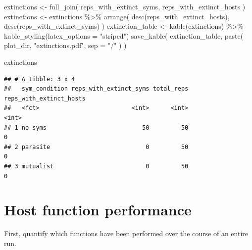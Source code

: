 \documentclass[
]{book}
\newenvironment{Shaded}{\begin{snugshade}}{\end{snugshade}}
\newcommand{\AttributeTok}[1]{\textcolor[rgb]{0.77,0.63,0.00}{#1}}
\newcommand{\FunctionTok}[1]{\textcolor[rgb]{0.00,0.00,0.00}{#1}}
\newcommand{\NormalTok}[1]{#1}
\newcommand{\OtherTok}[1]{\textcolor[rgb]{0.56,0.35,0.01}{#1}}
\newcommand{\SpecialCharTok}[1]{\textcolor[rgb]{0.00,0.00,0.00}{#1}}
\newcommand{\StringTok}[1]{\textcolor[rgb]{0.31,0.60,0.02}{#1}}
\begin{document}
\begin{Shaded}
\begin{Highlighting}[]
\NormalTok{extinctions }\OtherTok{\textless{}{-}} \FunctionTok{full\_join}\NormalTok{(}
\NormalTok{  reps\_with\_extinct\_syms,}
\NormalTok{  reps\_with\_extinct\_hosts}
\NormalTok{)}
\NormalTok{extinctions }\OtherTok{\textless{}{-}}\NormalTok{ extinctions }\SpecialCharTok{\%\textgreater{}\%}
  \FunctionTok{arrange}\NormalTok{(}
    \FunctionTok{desc}\NormalTok{(reps\_with\_extinct\_hosts), }\FunctionTok{desc}\NormalTok{(reps\_with\_extinct\_syms)}
\NormalTok{  )}
\NormalTok{extinction\_table }\OtherTok{\textless{}{-}} \FunctionTok{kable}\NormalTok{(extinctions) }\SpecialCharTok{\%\textgreater{}\%}
  \FunctionTok{kable\_styling}\NormalTok{(}\AttributeTok{latex\_options =} \StringTok{"striped"}\NormalTok{)}
\FunctionTok{save\_kable}\NormalTok{(}
\NormalTok{  extinction\_table,}
  \FunctionTok{paste}\NormalTok{(}
\NormalTok{    plot\_dir,}
    \StringTok{"extinctions.pdf"}\NormalTok{,}
    \AttributeTok{sep =} \StringTok{"/"}
\NormalTok{  )}
\NormalTok{)}

\NormalTok{extinctions}
\end{Highlighting}
\end{Shaded}

\begin{verbatim}
## # A tibble: 3 x 4
##   sym_condition reps_with_extinct_syms total_reps reps_with_extinct_hosts
##   <fct>                          <int>      <int>                   <int>
## 1 no-syms                           50         50                       0
## 2 parasite                           0         50                       0
## 3 mutualist                          0         50                       0
\end{verbatim}

\hypertarget{host-function-performance}{%
\section{Host function performance}\label{host-function-performance}}

First, quantify which functions have been performed over the course of an entire run.
\end{document}
